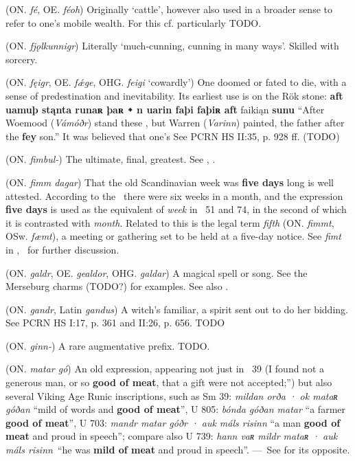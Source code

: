 \begin{itemize}
 (ON. \emph{fé}, OE. \emph{féoh})
  Originally ‘cattle’, however also used in a broader sense to refer to one’s mobile wealth. For this cf. particularly \Havamal TODO.

 (ON. \emph{fjǫlkunnigr})
  Literally ‘much-cunning, cunning in many ways’. Skilled with sorcery.

 (ON. \emph{fęigr}, OE. \emph{fǽge}, OHG. \emph{feigi} ‘cowardly’)
  One doomed or fated to die, with a sense of predestination and inevitability. Its earliest use is on the Rök stone: \textbf{aft uamuþ stąnta runaʀ þaʀ ᛭ n uarin faþi faþiʀ aft} faikiąn \textbf{sunu} “After Woemood (\emph{Vámóðr}) stand these , but Warren (\emph{Varinn}) painted, the father after the \textbf{fey} son.” It was believed that one’s See PCRN HS II:35, p. 928 ff. (TODO)

 (ON. \emph{fimbul-})
  The ultimate, final, greatest. See , .

 (ON. \emph{fimm dagar})
  That the old Scandinavian week was \textbf{five days} long is well attested. According to the \Gulatingslog\ there were six weeks in a month, and the expression \textbf{five days} is used as the equivalent of \emph{week} in \Havamal\ 51 and 74, in the second of which it is contrasted with \emph{month}. Related to this is the legal term \emph{fifth} (ON. \emph{fimmt}, OSw. \emph{fæmt}), a meeting or gathering set to be held at a five-day notice. See \emph{fimt} in \CV, \LMNL\ for further discussion.

 (ON. \emph{galdr}, OE. \emph{gealdor}, OHG. \emph{galdar})
  A magical spell or song. See the Merseburg charms (TODO?) for examples. See also .

 (ON. \emph{gandr}, Latin \emph{gandus})
  A witch’s familiar, a spirit sent out to do her bidding. See PCRN HS I:17, p. 361 and II:26, p. 656. TODO

 (ON. \emph{ginn-})
  A rare augmentative prefix. TODO.

 (ON. \emph{matar gó})
   An old expression, appearing not just in \Havamal\ 39 (I found not a generous man, or so \textbf{good of meat}, that a gift were not accepted;”) but also several Viking Age Runic inscriptions, such as Sm 39: \emph{mildan orða · ok mataʀ góðan} “mild of words and \textbf{good of meat}”, U 805: \emph{bónda góðan matar} “a farmer \textbf{good of meat}”, U 703: \emph{mandr matar góðr · auk máls risinn} “a man \textbf{good of meat} and proud in speech”; compare also U 739: \emph{hann vaʀ mildr mataʀ · auk máls risinn} “he was \textbf{mild of meat} and proud in speech”. — See  for its opposite.


\end{itemize}
